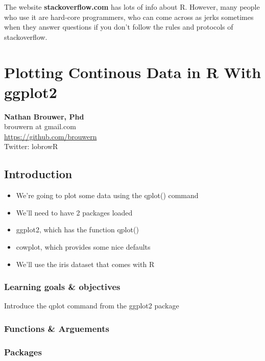 \documentclass[]{book}
\providecommand{\tightlist}{%
  \setlength{\itemsep}{0pt}\setlength{\parskip}{0pt}}
\theoremstyle{definition}
\theoremstyle{definition}
\theoremstyle{definition}
\theoremstyle{remark}
\begin{document}
The website \textbf{stackoverflow.com} has lots of info about R.
However, many people who use it are hard-core programmers, who can come
across as jerks sometimes when they answer questions if you don't follow
the rules and protocols of stackoverflow.

\chapter{Plotting Continous Data in R With
ggplot2}\label{plotting-continous-data-in-r-with-ggplot2}

\textbf{Nathan Brouwer, Phd}\\
brouwern at gmail.com\\
\url{https://github.com/brouwern}\\
Twitter: lobrowR

\section{Introduction}\label{introduction-6}

\begin{itemize}
\tightlist
\item
  We're going to plot some data using the qplot() command
\item
  We'll need to have 2 packages loaded
\item
  ggplot2, which has the function qplot()
\item
  cowplot, which provides some nice defaults
\item
  We'll use the iris dataset that comes with R
\end{itemize}

\subsection{Learning goals \&
objectives}\label{learning-goals-objectives}

Introduce the qplot command from the ggplot2 package

\subsection{Functions \& Arguements}\label{functions-arguements-4}

\subsection{Packages}\label{packages-5}
\end{document}
